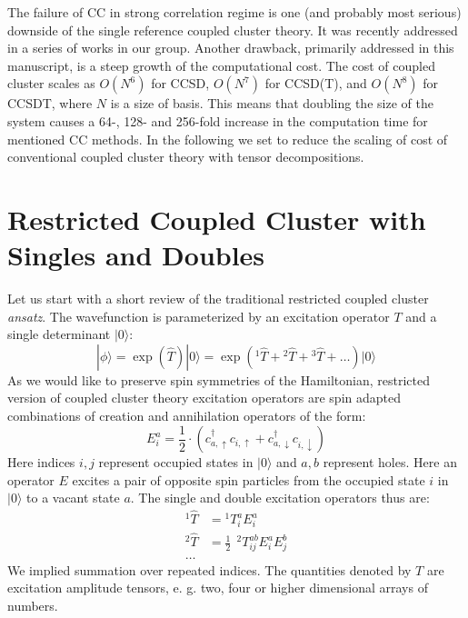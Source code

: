 The failure of CC in strong correlation regime is one (and 
probably most serious) downside of the single reference coupled cluster theory. 
It was recently addressed in a series of works in our 
group.\cite{degroote2016polynomial, gomez2017attenuated, qiu2017projected2, 
hermes2017combining} Another 
drawback, primarily addressed in this manuscript, is a steep growth of the
computational cost. The cost of coupled cluster scales as 
$O(N^6)$ for CCSD, $O(N^7)$ for CCSD(T), and $O(N^8)$ for CCSDT, where $N$ is a 
size of basis. This means that doubling the size of the system causes a 64-, 
128- and 256-fold increase in the computation time for mentioned CC methods. In 
the following we set to reduce the scaling of cost of conventional coupled 
cluster theory with tensor decompositions.

\section{Restricted Coupled Cluster with Singles and Doubles}
Let us start with a short review of the traditional restricted 
coupled cluster \emph{ansatz}.\cite{bartlett2007coupled} The wavefunction is 
parameterized by an excitation operator $T$ and a single determinant $| 0 
\rangle$:
%
\begin{equation}
 | \phi \rangle  = \exp(\hat{T}) | 0 \rangle = \exp({}^1\hat{T} + {}^2\hat{T} + 
{}^3\hat{T} + \ldots) | 0 \rangle
\end{equation}
%
As we would like to preserve spin symmetries of the Hamiltonian, restricted 
version of coupled cluster theory excitation operators are spin 
adapted combinations of creation and annihilation operators of the form:
%
\begin{equation}
E_{i}^{a}  = \frac{1}{2} \cdot (c_{a, \uparrow}^{\dagger} c_{i, \uparrow} + 
c_{a, \downarrow}^{\dagger} c_{i, \downarrow})
\end{equation}
%
Here indices $i, j$ represent occupied states in $|0\rangle$ and $a, b$ 
represent holes. Here an operator $E$ excites a pair of opposite spin particles 
from the occupied state $i$ in $|0\rangle$ to a vacant state $a$. The single 
and double excitation operators thus are:
%
\begin{equation}
\begin{split}
 {}^{1}\hat{T} & = {}^{1}T_{i}^{a} E_{i}^{a} \\
 {}^{2}\hat{T} & = \frac{1}{2} ~~ {}^{2}T_{ij}^{ab} E_{i}^{a} E_{j}^{b} \\
 \ldots
\end{split}
\end{equation}
%
We implied summation over repeated indices. The quantities denoted by $T$ are 
excitation amplitude tensors, e. g. two, four or higher dimensional arrays of 
numbers.

